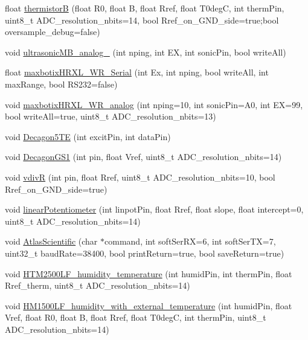 \begin{DoxyCompactItemize}
\item 
float \hyperlink{classLogger_a343dbf1edb8745ea9672f579d3e8297e}{thermistorB} (float R0, float B, float Rref, float T0degC, int therm\+Pin, uint8\+\_\+t A\+D\+C\+\_\+resolution\+\_\+nbits=14, bool Rref\+\_\+on\+\_\+\+G\+N\+D\+\_\+side=true;bool oversample\+\_\+debug=false)
\item 
void \hyperlink{classLogger_a362a1462166d63ddc613eaa1e86f9854}{ultrasonic\+M\+B\+\_\+analog\+\_\+1cm} (int nping, int EX, int sonic\+Pin, bool write\+All)
\item 
float \hyperlink{classLogger_a87ce56cb9c3dfc7abfd6308b2ee7dc10}{maxbotix\+H\+R\+X\+L\+\_\+\+W\+R\+\_\+\+Serial} (int Ex, int nping, bool write\+All, int max\+Range, bool R\+S232=false)
\item 
void \hyperlink{classLogger_aa05378a90963ceebf7dad0904a74f42f}{maxbotix\+H\+R\+X\+L\+\_\+\+W\+R\+\_\+analog} (int nping=10, int sonic\+Pin=A0, int EX=99, bool write\+All=true, uint8\+\_\+t A\+D\+C\+\_\+resolution\+\_\+nbits=13)
\item 
void \hyperlink{classLogger_a40ae372dee7f672a6d6f33ab441e4da1}{Decagon5\+TE} (int excit\+Pin, int data\+Pin)
\item 
void \hyperlink{classLogger_a84da6a9ec3d4d56fdc32d950b71f1a26}{Decagon\+G\+S1} (int pin, float Vref, uint8\+\_\+t A\+D\+C\+\_\+resolution\+\_\+nbits=14)
\item 
void \hyperlink{classLogger_ab1ae31b2bdb77c86fb6851907258171b}{vdivR} (int pin, float Rref, uint8\+\_\+t A\+D\+C\+\_\+resolution\+\_\+nbits=10, bool Rref\+\_\+on\+\_\+\+G\+N\+D\+\_\+side=true)
\item 
void \hyperlink{classLogger_a12dc18b7b16c91de5f7a3af7edb381a9}{linear\+Potentiometer} (int linpot\+Pin, float Rref, float slope, float intercept=0, uint8\+\_\+t A\+D\+C\+\_\+resolution\+\_\+nbits=14)
\item 
void \hyperlink{classLogger_a9fdcbb56e3e4910ac895ee150fe1b9ed}{Atlas\+Scientific} (char $\ast$command, int soft\+Ser\+RX=6, int soft\+Ser\+TX=7, uint32\+\_\+t baud\+Rate=38400, bool print\+Return=true, bool save\+Return=true)
\item 
void \hyperlink{classLogger_a4ccff7a14a6bddc8bb28e22b3b36d3cc}{H\+T\+M2500\+L\+F\+\_\+humidity\+\_\+temperature} (int humid\+Pin, int therm\+Pin, float Rref\+\_\+therm, uint8\+\_\+t A\+D\+C\+\_\+resolution\+\_\+nbits=14)
\item 
void \hyperlink{classLogger_af0eda5a0be93a4d8505c7493d0f5e333}{H\+M1500\+L\+F\+\_\+humidity\+\_\+with\+\_\+external\+\_\+temperature} (int humid\+Pin, float Vref, float R0, float B, float Rref, float T0degC, int therm\+Pin, uint8\+\_\+t A\+D\+C\+\_\+resolution\+\_\+nbits=14)

\end{DoxyCompactItemize}
